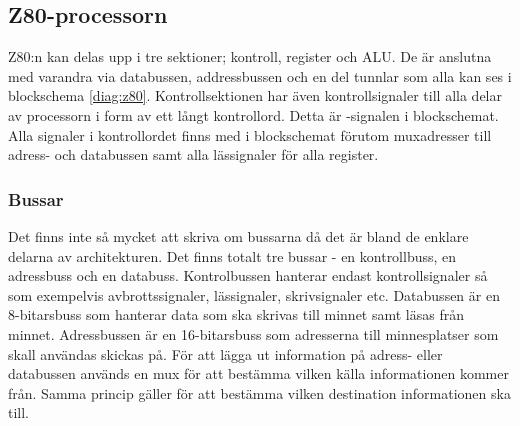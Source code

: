 \documentclass[main.tex]{subfiles}
\begin{document}
\subsection{Z80-processorn}
Z80:n kan delas upp i tre sektioner; kontroll, register och ALU. De är anslutna
med varandra via databussen, addressbussen och en del tunnlar som alla kan ses
i blockschema \ref{diag:z80}. Kontrollsektionen har även kontrollsignaler till
alla delar av processorn i form av ett långt kontrollord. Detta är
-signalen i blockschemat. Alla signaler i kontrollordet finns med i
blockschemat förutom muxadresser till adress- och databussen samt alla
lässignaler för alla register.





\subsubsection{Bussar}
Det finns inte så mycket att skriva om bussarna då det är bland de enklare
delarna av architekturen. Det finns totalt tre bussar - en kontrollbuss, en
adressbuss och en databuss. Kontrolbussen hanterar endast kontrollsignaler så
som exempelvis avbrottssignaler, lässignaler, skrivsignaler etc. Databussen är
en 8-bitarsbuss som hanterar data som ska skrivas till minnet samt läsas från
minnet. Adressbussen är en 16-bitarsbuss som adresserna till minnesplatser som
skall användas skickas på. För att lägga ut information på adress- eller
databussen används en mux för att bestämma vilken källa informationen kommer
från. Samma princip gäller för att bestämma vilken destination informationen
ska till.
\end{document}

